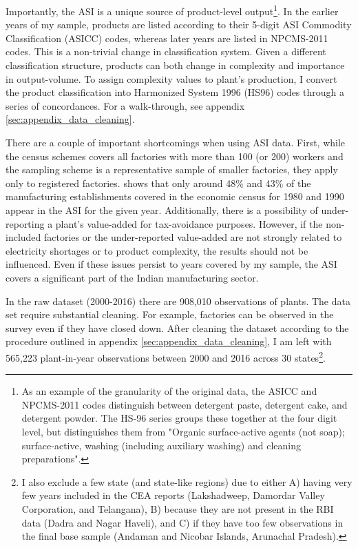 \documentclass[11pt]{article}
\begin{document}
Importantly, the ASI is a unique source of product-level output\footnote{As an example of the granularity of the original data, the ASICC and NPCMS-2011 codes distinguish between detergent paste, detergent cake, and detergent powder. The HS-96 series groups these together at the four digit level, but distinguishes them from "Organic surface-active agents (not soap); surface-active, washing (including auxiliary washing) and cleaning preparations".}. In the earlier years of my sample, products are listed according to their 5-digit ASI Commodity Classification (ASICC) codes, whereas later years are listed in NPCMS-2011 codes. This is a non-trivial change in classification system. Given a different classification structure, products can both change in complexity and importance in output-volume. To assign complexity values to plant's production, I convert the product classification into Harmonized System 1996 (HS96) codes through a series of concordances. For a walk-through, see appendix \ref{sec:appendix_data_cleaning}.

There are a couple of important shortcomings when using ASI data. First, while the census schemes covers all factories with more than 100 (or 200) workers and the sampling scheme is a representative sample of smaller factories, they apply only to registered factories. \cite{nagaraj_how_2002} shows that only around 48\% and 43\% of the manufacturing establishments covered in the economic census for 1980 and 1990 appear in the ASI for the given year. Additionally, there is a possibility of under-reporting a plant's value-added for tax-avoidance purposes. However, if the non-included factories or the under-reported value-added are not strongly related to electricity shortages or to product complexity, the results should not be influenced. Even if these issues persist to years covered by my sample, the ASI covers a significant part of the Indian manufacturing sector.

In the raw dataset (2000-2016) there are 908,010 observations of plants. The data set require substantial cleaning. For example, factories can be observed in the survey even if they have closed down. After cleaning the dataset according to the procedure outlined in appendix \ref{sec:appendix_data_cleaning}, I am left with 565,223 plant-in-year observations between 2000 and 2016 across 30 states\footnote{I also exclude a few state (and state-like regions) due to either A) having very few years included in the CEA reports (Lakshadweep, Damordar Valley Corporation, and Telangana), B) because they are not present in the RBI data (Dadra and Nagar Haveli), and C) if they have too few observations in the final base sample (Andaman and Nicobar Islands, Arunachal Pradesh).}.
\end{document}
